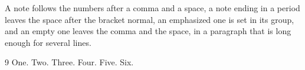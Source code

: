 \documentclass{article}
\begin{document}
A note follows the numbers \cite[p.~5]{b,a} after a comma and a space, a note ending in a period \cite[ch.~2 et seq.]{c} leaves the space after the bracket normal, an emphasized one \cite[\emph{passim}]{f,d,e} is set in its group, and an empty one \cite[]{a} leaves the comma and the space, in a paragraph that is long enough for several lines.

\begin{thebibliography}{9}
 One.
 Two.
 Three.
 Four.
 Five.
 Six.
\end{thebibliography}
\end{document}

